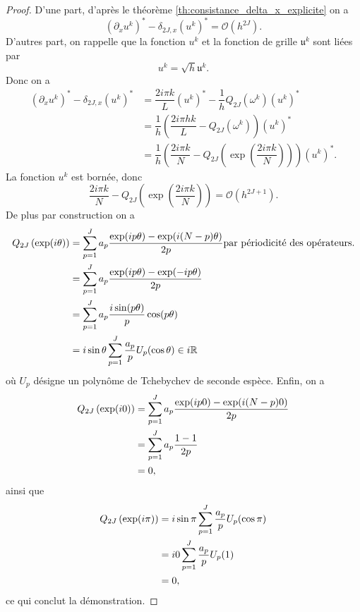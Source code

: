 \begin{proof}
D'une part, d'après le théorème \ref{th:consistance_delta_x_explicite} on a
\begin{equation}
(\partial_x u^k)^* - \delta_{2J,x}(u^k)^* = \mathcal{O}(h^{2J}).
\end{equation}
D'autres part, on rappelle que la fonction $u^k$ et la fonction de grille $\mathfrak{u}^k$ sont liées par
\begin{equation}
u^k = \sqrt{h} \mathfrak{u}^k.
\end{equation}
Donc on a 
\begin{align*}
(\partial_x u^k)^* - \delta_{2J,x}(u^k)^* & = \dfrac{2 i \pi k}{L}(u^k)^* - \dfrac{1}{h}Q_{2J}(\omega^k) (u^k)^* \\
	& = \dfrac{1}{h} \left( \dfrac{2 i \pi h k}{L} - Q_{2J}(\omega^k) \right) (u^k)^*\\
	& = \dfrac{1}{h} \left( \dfrac{2 i \pi k}{N} - Q_{2J} \left( \exp \left( \dfrac{2 i \pi k}{N} \right) \right) \right) (u^k)^* .
\end{align*}
La fonction $u^k$ est bornée, donc
\begin{equation}
\dfrac{2 i \pi k}{N} - Q_{2J} \left( \exp \left( \dfrac{2 i \pi k}{N} \right) \right) = \mathcal{O}(h^{2J+1}).
\end{equation}
De plus par construction on a
\begin{align*}
Q_{2J} \left( \exp ( i \theta ) \right) & = \displaystyle\sum\limits_{p=1}^J a_p \dfrac{\exp ( i p \theta ) - \exp ( i (N-p) \theta )}{2 p} \text{par périodicité des opérateurs.} \\
	& = \displaystyle\sum\limits_{p=1}^J a_p \dfrac{\exp ( i p \theta ) - \exp ( -i p \theta )}{2 p} \\
	& = \displaystyle\sum\limits_{p=1}^J a_p \dfrac{i \sin (p \theta )}{p} \cos ( p \theta) \\
	& = i \sin \theta \displaystyle\sum\limits_{p=1}^J \dfrac{a_p}{p} U_p (\cos \theta) \in i \mathbb{R}
\end{align*}
où $U_p$ désigne un polynôme de Tchebychev de seconde espèce.
Enfin, on a
\begin{align*}
Q_{2J} \left( \exp ( i 0 ) \right) & = \displaystyle\sum\limits_{p=1}^J a_p \dfrac{\exp ( i p 0 ) - \exp ( i (N-p) 0 )}{2 p}\\
& = \displaystyle\sum\limits_{p=1}^J a_p \dfrac{1 - 1}{2 p}\\
& = 0,
\end{align*}
ainsi que 
\begin{align*}
Q_{2J} \left( \exp ( i \pi ) \right)& = i \sin \pi \displaystyle\sum\limits_{p=1}^J \dfrac{a_p}{p} U_p (\cos \pi) \\
	& = i 0 \displaystyle\sum\limits_{p=1}^J \dfrac{a_p}{p} U_p (1) \\
	& = 0,
\end{align*}
ce qui conclut la démonstration.
\end{proof}
